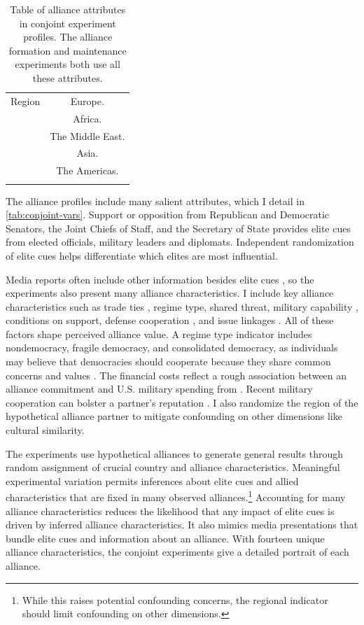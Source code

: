 \documentclass[12pt]{article}
\begin{document}
\begin{table}
\begin{adjustbox}{width = .99\textwidth}
\begin{tabular}{lc}
Region              & Europe. \\ 
                    & Africa. \\
                    & The Middle East. \\ 
                    & Asia. \\   
                    & The Americas. \\ 
                                                                            
\hline \\
\end{tabular}
\end{adjustbox}
\caption{Table of alliance attributes in conjoint experiment profiles. The alliance formation and maintenance experiments both use all these attributes.} 
\label{tab:conjoint-vars}
\end{table}


The alliance profiles include many salient attributes, which I detail in \autoref{tab:conjoint-vars}. 
Support or opposition from Republican and Democratic Senators, the Joint Chiefs of Staff, and the Secretary of State provides elite cues from elected officials, military leaders and diplomats. 
Independent randomization of elite cues helps differentiate which elites are most influential.


Media reports often include other information besides elite cues \citep{BaumPotter2008}, so the experiments also present many alliance characteristics. 
I include key alliance characteristics such as trade ties \citep{Fordham2010}, regime type, shared threat, military capability \citep{Johnsonetal2015}, conditions on support, defense cooperation \citep{Morrow1994, LeedsAnac2005}, and issue linkages \citep{Poast2012}.
All of these factors shape perceived alliance value. 
A regime type indicator includes nondemocracy, fragile democracy, and consolidated democracy, as individuals may believe that democracies should cooperate because they share common concerns and values \citep{Chuetal2021}. 
The financial costs reflect a rough association between an alliance commitment and U.S. military spending from \citet{AlleyFuhrmann2021}. 
Recent military cooperation can bolster a partner's reputation \citep{Crescenzietal2012, GannonKent2020}.
I also randomize the region of the hypothetical alliance partner to mitigate confounding on other dimensions like cultural similarity.


The experiments use hypothetical alliances to generate general results through random assignment of crucial country and alliance characteristics. 
Meaningful experimental variation permits inferences about elite cues and allied characteristics that are fixed in many observed alliances.\footnote{While this raises potential confounding concerns, the regional indicator should limit confounding on other dimensions.}
Accounting for many alliance characteristics reduces the likelihood that any impact of elite cues is driven by inferred alliance characteristics.
It also mimics media presentations that bundle elite cues and information about an alliance. 
With fourteen unique alliance characteristics, the conjoint experiments give a detailed portrait of each alliance.
\end{document}
